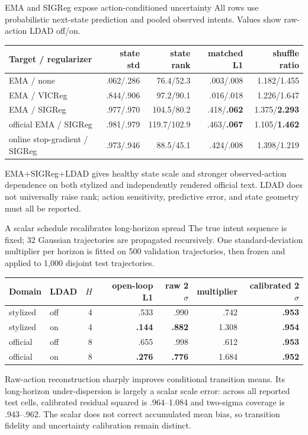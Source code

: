 \documentclass[aspectratio=169,10pt]{beamer}
\newcommand{\good}[1]{\textcolor{cgreen}{\textbf{#1}}}
\newcommand{\bad}[1]{\textcolor{cred}{\textbf{#1}}}
\begin{document}
\begin{frame}{EMA and SIGReg expose action-conditioned uncertainty}
\small
All rows use probabilistic next-state prediction and pooled observed intents.
Values show raw-action LDAD off/on.

\medskip
\centering
\begin{tabular}{lrrrr}
\toprule
Target / regularizer & state std & state rank & matched L1 & shuffle ratio\\
\midrule
EMA / none & .062/.286 & 76.4/52.3 & .003/.008 & 1.182/1.455\\
EMA / VICReg & .844/.906 & 97.2/90.1 & .016/.018 & 1.226/1.647\\
EMA / SIGReg & .977/.970 & 104.5/80.2 & .418/\good{.062} & 1.375/\good{2.293}\\
official EMA / SIGReg & .981/.979 & 119.7/102.9 & .463/\good{.067} & 1.105/\good{1.462}\\
online stop-gradient / SIGReg & .973/.946 & 88.5/45.1 & .424/.008 & 1.398/1.219\\
\bottomrule
\end{tabular}

\medskip
EMA+SIGReg+LDAD gives healthy state scale and stronger observed-action
dependence on both stylized and independently rendered official text. LDAD
does not universally raise rank; action sensitivity, predictive error, and
state geometry must all be reported.
\end{frame}

\begin{frame}{A scalar schedule recalibrates long-horizon spread}
\scriptsize
The true intent sequence is fixed; 32 Gaussian trajectories are propagated
recursively. One standard-deviation multiplier per horizon is fitted on 500
validation trajectories, then frozen and applied to 1,000 disjoint test
trajectories.

\medskip
\centering
\begin{tabular}{llrrrrr}
\toprule
Domain & LDAD & $H$ & open-loop L1 & raw 2$\sigma$ & multiplier & calibrated 2$\sigma$\\
\midrule
stylized & off & 4 & .533 & .990 & .742 & \good{.953}\\
stylized & on  & 4 & \good{.144} & \bad{.882} & 1.308 & \good{.954}\\
official & off & 8 & .655 & .998 & .612 & \good{.953}\\
official & on  & 8 & \good{.276} & \bad{.776} & 1.684 & \good{.952}\\
\bottomrule
\end{tabular}

\medskip
\raggedright
Raw-action reconstruction sharply improves conditional transition means. Its
long-horizon under-dispersion is largely a scalar scale error: across all
reported test cells, calibrated residual squared is .964--1.084 and two-sigma
coverage is .943--.962. The scalar does not correct accumulated mean bias, so
transition fidelity and uncertainty calibration remain distinct.
\end{frame}
\end{document}
